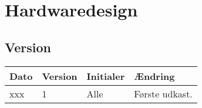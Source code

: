\chapter{Hardwaredesign}
\section*{Version}
\begin{table}[h]
	\centering
	\begin{tabularx}{\textwidth - 2cm}{|l|l|l|X|}
	\hline
	Dato			& Version			& Initialer 		& Ændring										\\ \hline
	xxx 			& 1 				& Alle				& Første udkast. 								\\ \hline
	\end{tabularx}
\end{table}
\clearpage



